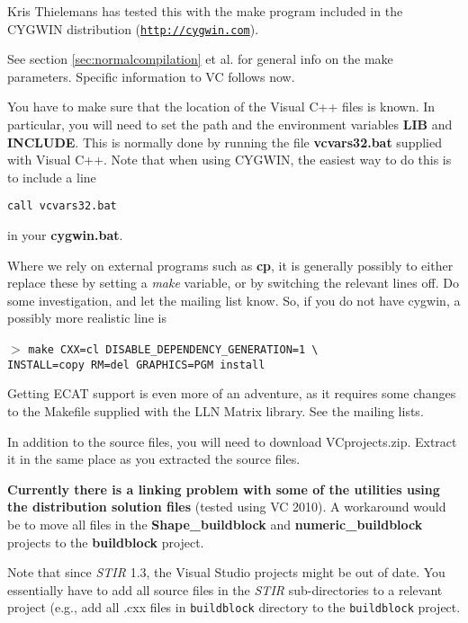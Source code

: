 \documentclass{article}
\def\R2Lurl#1#2{\mbox{\href{#1}{\tt #2}}}
\newcommand{\cmdline}[1]{\par \noindent $>$ \texttt{#1}\par}
\begin{document}
Kris Thielemans has tested this with the make program included in the CYGWIN 
distribution (\R2Lurl{http://cygwin.com }{http://cygwin.com}). 



See section \ref{sec:normalcompilation} et al. for general info on the make parameters. 
Specific information to VC follows now.



You have to make sure that the location of the Visual C++ files 
is known. In particular, you will need to set the path and the 
environment variables \textbf{LIB} and \textbf{INCLUDE}. This is normally 
done by running the file \textbf{vcvars32.bat} supplied with Visual 
C++. Note that when using CYGWIN, the easiest way to do this 
is to include a line 
\begin{verbatim}
call vcvars32.bat
\end{verbatim} 
in your  \textbf{cygwin.bat}.



Where we rely on external programs such as \textbf{cp}, it is generally 
possibly to either replace these by setting a \textit{make} variable, 
or by switching the relevant lines off. Do some investigation, 
and let the mailing list know. So, if you do not have cygwin, 
a possibly more realistic line is
\cmdline{make CXX=cl DISABLE\_DEPENDENCY\_GENERATION=1 {\textbackslash}\\
 INSTALL=copy 
RM=del GRAPHICS=PGM install}


Getting ECAT support is even more of an adventure, as it requires 
some changes to the Makefile supplied with the LLN Matrix library. 
See the mailing lists.

{ 
}
In addition to the source files, you will need to download VCprojects.zip. 
Extract it in the same place as you extracted the source files. 

\textbf{Currently there is a linking problem with some of the utilities using
the distribution solution files} (tested using VC 2010). A workaround would be to move all files
in the \textbf{Shape\_buildblock} and \textbf{numeric\_buildblock} projects to the \textbf{buildblock}
project.

Note that since \textit{STIR} 1.3, the Visual Studio projects might be 
out of date. You essentially have to add all source files in the
\textit{STIR} sub-directories to a relevant project (e.g., add 
all .cxx files in \texttt{buildblock} directory to the \texttt{buildblock}
project.
\end{document}
